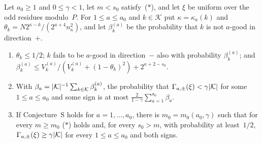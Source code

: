\begin{proposition}\label{prop:S-shift}
Let $a_0\ge1$ and $0\le\gamma<1$, let $m<s_0$ satisfy~\textup{($\ast$)}, and let $\xi$ be uniform over the odd residues
modulo~$P$. For $1\le a\le a_0$ and $k\in\mathcal K$ put $\kappa=\kappa_a(k)$ and
$\theta_k=N2^{\kappa-k}/(2^{a+4}n_\kappa^2)$, and let $\beta^{(a)}_k$ be the probability that $k$ is not $a$-good in
direction~$+$.
\begin{enumerate}[label=(\alph*)]
\item $\theta_k\le1/2$; $k$ fails to be $a$-good in direction~$-$ also with probability $\beta^{(a)}_k$; and
  $\beta^{(a)}_k\le V^{(a)}_k/(V^{(a)}_k+(1-\theta_k)^2)+2^{\kappa+2-s_0}$.
\item With $\beta_a=\lvert \mathcal K \rvert^{-1}\sum_{k\in\mathcal K}\beta^{(a)}_k$, the probability that
  $\Gamma_{a,\pm}(\xi)<\gamma\lvert \mathcal K \rvert$ for some $1\le a\le a_0$ and some sign is at most
  $\frac2{1-\gamma}\sum_{a=1}^{a_0}\beta_a$.
\item If Conjecture~S holds for $a=1,\dots,a_0$, there is $m_0=m_0(a_0,\gamma)$ such that for every $m\ge m_0$
  \textup{($\ast$)} holds and, for every $s_0>m$, with probability at least~$1/2$,
  $\Gamma_{a,\pm}(\xi)\ge\gamma\lvert \mathcal K \rvert$ for every $1\le a\le a_0$ and both signs.
\end{enumerate}
\end{proposition}

